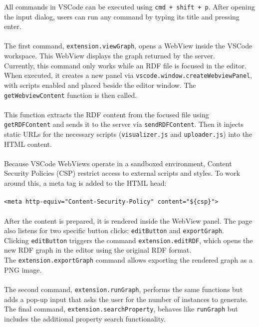 All commands in VSCode can be executed using \texttt{cmd + shift + p}. After opening the input dialog, users can run any command by typing its title and pressing enter.
\\
\\
The first command, \texttt{extension.viewGraph}, opens a WebView inside the VSCode workspace. This WebView displays the graph returned by the server.
\\
Currently, this command only works while an RDF file is focused in the editor. When executed, it creates a new panel via \texttt{vscode.window.createWebviewPanel}, with scripts enabled and placed beside the editor window. The \texttt{getWebviewContent} function is then called.
\\
\\
This function extracts the RDF content from the focused file using \texttt{getRDFContent} and sends it to the server via \texttt{sendRDFContent}. Then it injects static URLs for the necessary scripts (\texttt{visualizer.js} and \texttt{uploader.js}) into the HTML content.
\\
\\
Because VSCode WebViews operate in a sandboxed environment, Content Security Policies (CSP) restrict access to external scripts and styles. To work around this, a meta tag is added to the HTML head:
\\
\\
\texttt{<meta http-equiv="Content-Security-Policy" content="\$\{csp\}">}
\\
\\
After the content is prepared, it is rendered inside the WebView panel. The page also listens for two specific button clicks: \texttt{editButton} and \texttt{exportGraph}.
\\
Clicking \texttt{editButton} triggers the command \texttt{extension.editRDF}, which opens the new RDF graph in the editor using the original RDF format.
\\
The \texttt{extension.exportGraph} command allows exporting the rendered graph as a PNG image.
\\
\\
The second command, \texttt{extension.runGraph}, performs the same functions but adds a pop-up input that asks the user for the number of instances to generate.
\\
The final command, \texttt{extension.searchProperty}, behaves like \texttt{runGraph} but includes the additional property search functionality.


